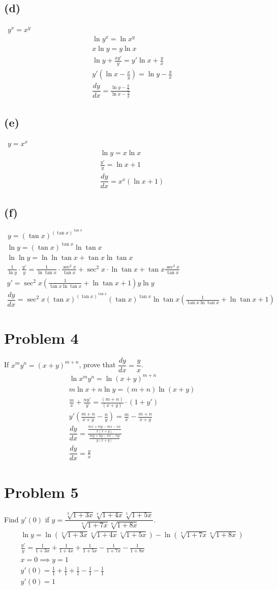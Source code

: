 \documentclass[12pt]{article}
\newcommand{\dydx}{\dfrac{dy}{dx}}
\newcommand{\problem}[1]{\section{Problem #1}}
\newcommand{\subproblem}[1]{\subsection{(#1)} \,}
\begin{document}
\subproblem{d} $y^x=x^y$
\begin{gather*}
    \ln y^x=\ln x^y\\
    x\ln y=y\ln x\\
    \ln y +\frac{xy'}{y}=y'\ln x+\frac{y}{x}\\
    y'(\ln x-\frac{x}{y})=\ln y-\frac{y}{x}\\
    \boxed{\dydx = \frac{\ln y-\frac{y}{x}}{\ln x-\frac{x}{y}}}
\end{gather*}

\subproblem{e} $y=x^x$
\begin{gather*}
    \ln y=x \ln x\\
    \frac{y'}{y} =\ln x+1\\
    \boxed{\dydx = x^x(\ln x +1)}
\end{gather*}

\subproblem{f} $y=(\tan x)^{(\tan x)^{\tan x}}$
\begin{gather*}
    \ln y=(\tan x)^{\tan x}\ln \tan x\\
    \ln \ln y =\ln \ln \tan x+ \tan x \ln \tan x\\
    \frac{1}{\ln y} \cdot \frac{y'}{y}=\frac{1}{\ln \tan x}\cdot \frac{\sec ^2 x}{\tan x}+\sec^2
    x \cdot \ln \tan x +\tan x\frac{\sec^2x}{\tan x}\\
    y'=\sec ^2 x(\frac{1}{\tan x\ln \tan x}+\ln \tan x+1)y\ln y\\
    \boxed{\dydx = \sec ^2 x(\tan x)^{(\tan x)^{\tan x}}(\tan x)^{\tan x}\ln \tan x(\frac{1}{\tan x\ln \tan x}+\ln \tan x+1)}
\end{gather*}

\problem{4}
If $x^my^n=(x+y)^{m+n}$, prove that $\dydx=\dfrac{y}{x}$.
\begin{gather*}
    \ln x^my^n=\ln (x+y)^{m+n}\\
    m\ln x+n\ln y=(m+n)\ln (x+y)\\
    \frac{m}{x}+\frac{ny'}{y}=\frac{(m+n)}{(x+y)}\cdot (1+y')\\
    y'(\frac{m+n}{x+y}-\frac{n}{y})=\frac{m}{x}-\frac{m+n}{x+y}\\
    \dydx =\frac{\frac{mx+my-mx-nx}{x(x+y)}}{\frac{my+ny-nx-ny}{y(x+y)}}\\
    \boxed{\dydx = \frac{y}{x}}
\end{gather*}

\problem{5}
Find $y'(0)$ if $y=\dfrac{\sqrt[3]{1+3x}\sqrt[4]{1+4x}\sqrt[5]{1+5x}}{\sqrt[7]{1+7x}\sqrt[8]{1+8x}}$.
\begin{gather*}
    \ln y = \ln (\sqrt[3]{1+3x}\sqrt[4]{1+4x}\sqrt[5]{1+5x})-\ln (\sqrt[7]{1+7x}\sqrt[8]{1+8x})\\
    \frac{y'}{y}=\frac{1}{1+3x}+\frac{1}{1+4x}+\frac{1}{1+5x}-\frac{1}{1+7x}-\frac{1}{1+8x}\\
    x=0 \implies y=1\\
    y'(0)=\frac{1}{1}+\frac{1}{1}+\frac{1}{1}-\frac{1}{1}-\frac{1}{1}\\
    \boxed{y'(0)=1}
\end{gather*}
\end{document}
